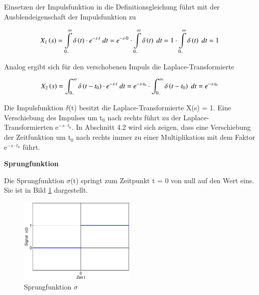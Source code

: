 \noindent Einsetzen der Impulsfunktion in die Definitionsgleichung f\"{u}hrt mit der Ausblendeigenschaft der Impulsfunktion zu

\begin{equation}\label{eq:foureleven}
X_{1} \left(s\right)=\int\limits _{0_{-} }^{\infty }\delta \left(t\right)\cdot e^{-s\cdot t} {\rm \; } dt=e^{-s\cdot 0} \cdot \int\limits _{0_{-} }^{\infty }\delta \left(t\right){\rm \; } dt=1\cdot \int\limits _{0_{-} }^{\infty }\delta \left(t\right){\rm \; } dt=1
\end{equation}

\noindent Analog ergibt sich f\"{u}r den verschobenen Impuls die Laplace-Transformierte 

\begin{equation}\label{eq:fourtwelve}
X_{2} \left(s\right)=\int _{0_{-} }^{\infty }\delta \left(t-t_{0} \right)\cdot e^{-s\cdot t} {\rm \; } dt=e^{-s\cdot t_{0} } \cdot \int _{0_{-} }^{\infty }\delta \left(t-t_{0} \right){\rm \; } dt=e^{-s\cdot t_{0} }
\end{equation}

\noindent Die Impulsfunktion $\delta$(t) besitzt die Laplace-Transformierte X(s) = 1. Eine Verschiebung des Impulses um t$_{0}$ nach rechts führt zu der Laplace-Transformierten e$^{-s\cdot t_{0}}$. In Abschnitt 4.2 wird sich zeigen, dass eine Verschiebung der Zeitfunktion um t$_{0}$ nach rechts immer zu einer Multiplikation mit dem Faktor e$^{-s\cdot t_{0}}$ führt.\bigskip

{\selectfont
\noindent\textbf{Sprungfunktion}}\smallskip

\noindent Die Sprungfunktion $\sigma$(t) springt zum Zeitpunkt t = 0 von null auf den Wert eins. Sie ist in Bild \ref{fig:LaplaceSignaleSprung} dargestellt.

\begin{figure}[H]
  \centerline{\includegraphics[width=0.5\textwidth]{Kapitel3/Bilder/image3}}
  \caption{Sprungfunktion $\sigma$}
  \label{fig:LaplaceSignaleSprung}
\end{figure}

